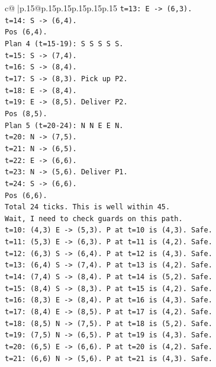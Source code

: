\documentclass{article}
\begin{document}
{\begin{supertabular}{c@{$\;$}|p{.15\linewidth}@{}p{.15\linewidth}p{.15\linewidth}p{.15\linewidth}p{.15\linewidth}p{.15\linewidth}}
{{{\texttt{t=13: E {-}> (6,3).} \\
\texttt{t=14: S {-}> (6,4).} \\
\texttt{Pos (6,4).} \\
\texttt{Plan 4 (t=15{-}19): S S S S S.} \\
\texttt{t=15: S {-}> (7,4).} \\
\texttt{t=16: S {-}> (8,4).} \\
\texttt{t=17: S {-}> (8,3). Pick up P2.} \\
\texttt{t=18: E {-}> (8,4).} \\
\texttt{t=19: E {-}> (8,5). Deliver P2.} \\
\texttt{Pos (8,5).} \\
\texttt{Plan 5 (t=20{-}24): N N E E N.} \\
\texttt{t=20: N {-}> (7,5).} \\
\texttt{t=21: N {-}> (6,5).} \\
\texttt{t=22: E {-}> (6,6).} \\
\texttt{t=23: N {-}> (5,6). Deliver P1.} \\
\texttt{t=24: S {-}> (6,6).} \\
\texttt{Pos (6,6).} \\
\texttt{Total 24 ticks. This is well within 45.} \\
\texttt{Wait, I need to check guards on this path.} \\
\texttt{t=10: (4,3) E {-}> (5,3). P at t=10 is (4,3). Safe.} \\
\texttt{t=11: (5,3) E {-}> (6,3). P at t=11 is (4,2). Safe.} \\
\texttt{t=12: (6,3) S {-}> (6,4). P at t=12 is (4,3). Safe.} \\
\texttt{t=13: (6,4) S {-}> (7,4). P at t=13 is (4,2). Safe.} \\
\texttt{t=14: (7,4) S {-}> (8,4). P at t=14 is (5,2). Safe.} \\
\texttt{t=15: (8,4) S {-}> (8,3). P at t=15 is (4,2). Safe.} \\
\texttt{t=16: (8,3) E {-}> (8,4). P at t=16 is (4,3). Safe.} \\
\texttt{t=17: (8,4) E {-}> (8,5). P at t=17 is (4,2). Safe.} \\
\texttt{t=18: (8,5) N {-}> (7,5). P at t=18 is (5,2). Safe.} \\
\texttt{t=19: (7,5) N {-}> (6,5). P at t=19 is (4,3). Safe.} \\
\texttt{t=20: (6,5) E {-}> (6,6). P at t=20 is (4,2). Safe.} \\
\texttt{t=21: (6,6) N {-}> (5,6). P at t=21 is (4,3). Safe.} \\
}}}
\end{supertabular}}
\end{document}

